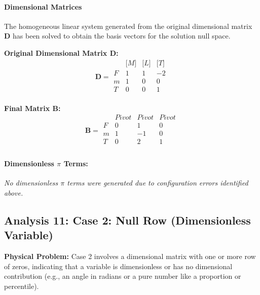                 \paragraph{Dimensional Matrices}
                The homogeneous linear system generated from the original dimensional matrix $\mathbf{D}$ has been solved to obtain the basis vectors for the solution null space.

                \textbf{Original Dimensional Matrix $\mathbf{D}$:}
                \[\mathbf{D} = \begin{array}{r|rrr}
                & \text{[}M\text{]} & \text{[}L\text{]} & \text{[}T\text{]} \\
                \hline
                F & 1 & 1 & -2 \\
m & 1 & 0 & 0 \\
T & 0 & 0 & 1 \\

                \end{array}\]


        \textbf{Final Matrix $\mathbf{B}$:}
        \[\mathbf{B} = \begin{array}{r|rrr}
        & Pivot & Pivot & Pivot \\
        \hline
        F & 0 & 1 & 0 \\
m & 1 & -1 & 0 \\
T & 0 & 2 & 1 \\

        \end{array}\]

        \paragraph{Dimensionless $\pi$ Terms: }
        \textit{No dimensionless $\pi$ terms were generated due to configuration errors identified above.}


\subsection{Analysis 11: Case 2: Null Row (Dimensionless Variable)}
\label{sec:Case_2_Null_Row_Dimensionless_Variable}

\begin{problembox}
\textbf{Physical Problem:} Case 2 involves a dimensional matrix with one or more row of zeros, indicating that a variable is dimensionless or has no dimensional contribution (e.g., an angle in radians or a pure number like a proportion or percentile).
\end{problembox}

